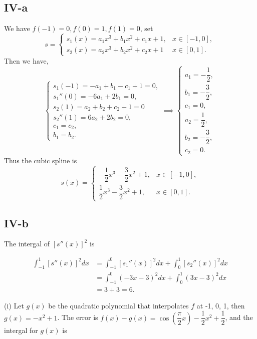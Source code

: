 \documentclass[a4paper]{article}
\begin{document}
\subsection*{IV-a}
We have $f(-1) = 0, f(0) = 1, f(1) = 0$, set
\[
s=\begin{cases}
  s_1(x) = a_1x^3 + b_1 x^2 + c_1 x + 1, & x \in [-1,0], \\
  s_2(x) =  a_2x^3 + b_2 x^2 + c_2 x + 1& x \in [0,1].
\end{cases}
\] 
Then we have, 
\[\begin{cases}
  s_1(-1) = -a_1 + b_1 - c_1 + 1 =0, \\
  s_1''(0) = -6 a_1  +2 b_1 = 0, \\
  s_2(1) = a_2 + b_2 + c_2 + 1 = 0\\
  s_2''(1) = 6 a_2 + 2 b_2 = 0,\\
  c_1 = c_2 ,\\
  b_1 = b_2.
\end{cases}
\implies
\begin{cases}
  a_1 = -\dfrac{1}{2}, \\
  b_1 = -\dfrac{3}{2}, \\
  c_1 = 0, \\
  a_2 = \dfrac{1}{2}, \\
  b_2 = -\dfrac{3}{2}, \\
  c_2 = 0.
\end{cases}
\]
Thus the cubic spline is
\[
s(x) = \begin{cases}
  -\dfrac{1}{2}x^3 - \dfrac{3}{2} x^2 + 1, & x \in [-1,0], \\
  \dfrac{1}{2}x^3 - \dfrac{3}{2} x^2 + 1, & x \in [0,1].
\end{cases}
\]

\subsection*{IV-b}
The intergal of $[s''(x)]^2$ is

\begin{align*}
  \int_{-1}^{1} [s''(x)]^2dx &= \int_{-1}^{0} [s_1''(x)]^2dx + \int_{0}^{1} [s_2''(x)]^2dx \\
  &= \int_{-1}^{0} (-3x -3)^2dx + \int_{0}^{1} (3x-3)^2dx \\
  &= 3 + 3 = 6 .
\end{align*}

(i) Let $g(x)$ be the quadratic polynomial that interpolates $f$ at -1, 0, 1, then $g(x) = -x^2 +1$. The error is $f(x) - g(x) = \cos(\dfrac{\pi}{2}x) - \dfrac{1}{2}x^2 + \dfrac{1}{2}$, and the intergal for $g(x)$ is
\end{document}
